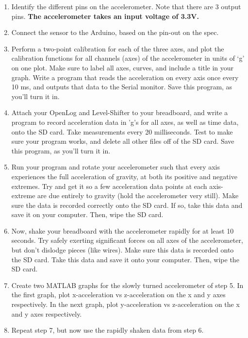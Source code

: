 \documentclass[12pt]{article}
\begin{document}
	\begin{enumerate}
		\item Identify the different pins on the accelerometer. Note that there are 3 output pins. \textbf{The accelerometer takes an input voltage of 3.3V.}
	
		\item Connect the sensor to the Arduino, based on the pin-out on the spec.
	
		\item Perform a two-point calibration for each of the three axes, and plot the calibration functions for all channels (axes) of the accelerometer in units of `g' on one plot. Make sure to label all axes, curves, and include a title in your graph. Write a program that reads the acceleration on every axis once every 10 ms, and outputs that data to the Serial monitor. Save this program, as you'll turn it in.
		
		\item Attach your OpenLog and Level-Shifter to your breadboard, and write a program to record acceleration data in 'g's for all axes, as well as time data, onto the SD card. Take measurements every 20 milliseconds. Test to make sure your program works, and delete all other files off of the SD card. Save this program, as you'll turn it in.
		
		\item Run your program and rotate your accelerometer such that every axis experiences the full acceleration of gravity, at both its positive and negative extremes. Try and get it so a few acceleration data points at each axis-extreme are due entirely to gravity (hold the accelerometer very still). Make sure the data is recorded correctly onto the SD card. If so, take this data and save it on your computer. Then, wipe the SD card.
		
		\item Now, shake your breadboard with the accelerometer rapidly for at least 10 seconds. Try safely exerting significant forces on all axes of the accelerometer, but don't dislodge pieces (like wires). Make sure this data is recorded onto the SD card. Take this data and save it onto your computer. Then, wipe the SD card.
		
	    \item Create two MATLAB graphs for the slowly turned accelerometer of step 5. In the first graph, plot x-acceleration vs z-acceleration on the x and y axes respectively. In the next graph, plot y-acceleration vs z-acceleration on the x and y axes respectively. 
	    
	    \item Repeat step 7, but now use the rapidly shaken data from step 6.  
		
	\end{enumerate}
\end{document}
